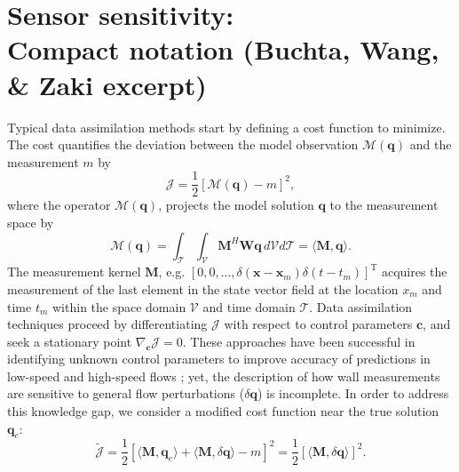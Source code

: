 \pagebreak
\appendix
\section{Sensor sensitivity: \\Compact notation (Buchta, Wang, \& Zaki excerpt)}\label{app:compact}
Typical data assimilation methods start by defining a cost function to minimize. The cost quantifies the deviation between the model observation $\mathcal{M}(\mathbf{q})$ and the measurement $m$ by
\begin{equation}\label{eq:cost}
\mathcal{J} = \frac{1}{2} [\mathcal{M}(\mathbf{q})-m]^2,
\end{equation}
where the operator $\mathcal{M}(\mathbf{q})$, projects the model solution $\mathbf{q}$ to the measurement space by
\begin{equation}
\mathcal{M}(\mathbf{q}) = \int_\mathcal{\mathcal{T}} \int_\mathcal{V}  \mathbf{M}^H {\mathbf{W}}\mathbf{q} \,d\mathcal{V}d\mathcal{T} =\langle \mathbf{M}, \mathbf{q} \rangle.
\end{equation}
The measurement kernel $\mathbf{M}$, e.g. $[0,0,\ldots,\delta(\mathbf{x}-\mathbf{x}_m)\delta(t-t_m)]^{\mathrm{T}}$ %
acquires the measurement of the last element in the state vector field at the location $x_m$ and time $t_m$ within the space domain $\mathcal{V}$ and time domain $\mathcal{T}$. Data assimilation techniques proceed by differentiating $\mathcal{J}$ with respect to control parameters $\mathbf{c}$, and seek a stationary point $\nabla_{\mathbf{c}} \mathcal{J}=0$. These approaches have been successful in identifying unknown control parameters to improve accuracy of predictions in low-speed \citep{wang2019spatial, wang2019discrete,wang_zaki_2021} and high-speed flows \citep{buchta_zaki_2021}; yet, the description of how wall measurements are sensitive to general flow perturbations ($\delta \mathbf{q}$) is incomplete.  In order to address this knowledge gap, we consider a modified cost function near the true solution $\mathbf{q}_e$: 
\begin{equation}\label{eq:cost:expanded}
\widetilde{\mathcal{J}} =\frac{1}{2}\left[
\langle \mathbf{M},\mathbf{q}_e \rangle + \langle \mathbf{M},\delta \mathbf{q} \rangle  - m\right]^2 = \frac{1}{2}\left[
\langle \mathbf{M},\delta \mathbf{q} \rangle \right]^2.
\end{equation}
